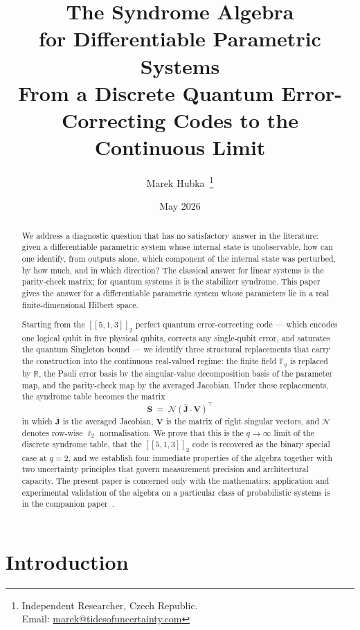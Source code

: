 \documentclass[11pt,a4paper]{article}
\title{%
  \textbf{The Syndrome Algebra \\for Differentiable Parametric Systems}\\[0.4em]
  \large From a Discrete Quantum Error-Correcting Codes to the Continuous Limit
}
\author{Marek Hubka\, \orcidlink{0009-0003-2476-9017}
  \thanks{Independent Researcher, Czech Republic.\\
    Email: \href{mailto:marek@tidesofuncertainty.com}{marek@tidesofuncertainty.com}}}
\date{May 2026}
\theoremstyle{definition}
\newcommand{\Vm}{\mathbf{V}}
\newcommand{\Sm}{\mathbf{S}}
\newcommand{\Jm}{\mathbf{J}}
\newcommand{\Rbb}{\mathbb{R}}
\newcommand{\Fbb}{\mathbb{F}}
\newcommand{\Nop}{\mathcal{N}}
\begin{document}
\maketitle

\begin{abstract}
We address a diagnostic question that has no satisfactory answer in the literature: given a differentiable parametric system whose internal state is unobservable, how can one identify, from outputs alone, which component of the internal state was perturbed, by how much, and in which direction? The classical answer for linear systems is the parity-check matrix; for quantum systems it is the stabilizer syndrome. This paper gives the answer for a differentiable parametric system whose parameters lie in a real finite-dimensional Hilbert space.

Starting from the $[\![5,1,3]\!]_2$ perfect quantum error-correcting code --- which encodes one logical qubit in five physical qubits, corrects any single-qubit error, and saturates the quantum Singleton bound --- we identify three structural replacements that carry the construction into the continuous real-valued regime: the finite field $\Fbb_q$ is replaced by $\Rbb$, the Pauli error basis by the singular-value decomposition basis of the parameter map, and the parity-check map by the averaged Jacobian. Under these replacements, the syndrome table becomes the matrix
\[
\Sm \;=\; \Nop\!\left(\bar{\Jm}\cdot\Vm\right)^{\!\top}
\]
in which $\bar{\Jm}$ is the averaged Jacobian, $\Vm$ is the matrix of right singular vectors, and $\Nop$ denotes row-wise $\ell_2$ normalisation. We prove that this is the $q\to\infty$ limit of the discrete syndrome table, that the $[\![5,1,3]\!]_2$ code is recovered as the binary special case at $q=2$, and we establish four immediate properties of the algebra together with two uncertainty principles that govern measurement precision and architectural capacity. The present paper is concerned only with the mathematics; application and experimental validation of the algebra on a particular class of probabilistic systems is in the companion paper~\cite{ThreeModesLLM}.
\end{abstract}

\newpage
\tableofcontents
\newpage

\section{Introduction}
\label{sec:intro}
\end{document}
